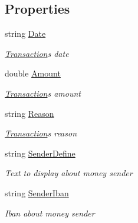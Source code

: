 \subsection*{Properties}
\begin{DoxyCompactItemize}
\item 
string \mbox{\hyperlink{class_projet_banque_1_1_transaction_ac76605aef978ac57cea8d373b617c7c0}{Date}}
\begin{DoxyCompactList}\small\item\em \mbox{\hyperlink{class_projet_banque_1_1_transaction}{Transaction}}\textquotesingle{}s date \end{DoxyCompactList}\item 
double \mbox{\hyperlink{class_projet_banque_1_1_transaction_aedd9199945b63b53613df8b6ddd2dc7f}{Amount}}
\begin{DoxyCompactList}\small\item\em \mbox{\hyperlink{class_projet_banque_1_1_transaction}{Transaction}}\textquotesingle{}s amount \end{DoxyCompactList}\item 
string \mbox{\hyperlink{class_projet_banque_1_1_transaction_ac8625e281f75ad2eb1512db70cd90ec8}{Reason}}
\begin{DoxyCompactList}\small\item\em \mbox{\hyperlink{class_projet_banque_1_1_transaction}{Transaction}}\textquotesingle{}s reason \end{DoxyCompactList}\item 
string \mbox{\hyperlink{class_projet_banque_1_1_transaction_a03b93454caad64a6f271df40a88bb585}{Sender\+Define}}
\begin{DoxyCompactList}\small\item\em Text to display about money sender \end{DoxyCompactList}\item 
string \mbox{\hyperlink{class_projet_banque_1_1_transaction_a227080527c4fc0cd4cb37f15cf5f505e}{Sender\+Iban}}
\begin{DoxyCompactList}\small\item\em Iban about money sender \end{DoxyCompactList}\item 

\end{DoxyCompactItemize}
